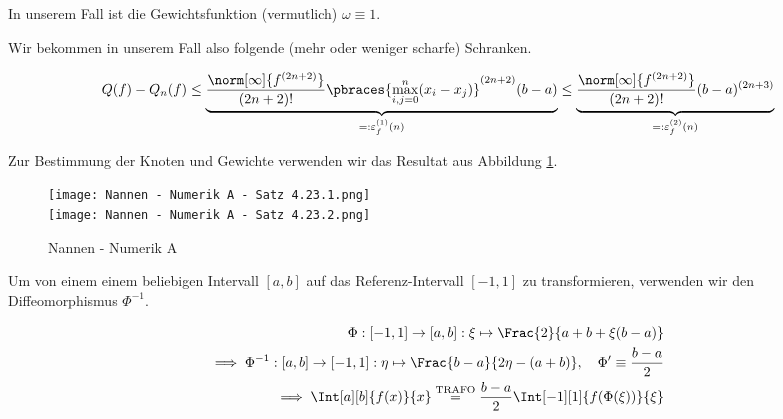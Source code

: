 \begin{solution}

In unserem Fall ist die Gewichtsfunktion (vermutlich) $\omega \equiv 1$.


Wir bekommen in unserem Fall also folgende (mehr oder weniger scharfe) Schranken.

\begin{align*}
  Q(f) - Q_n(f)
  \leq
  \underbrace
  {
    \frac
    {
      \norm[\infty]{f^{(2n+2)}}
    }{
      (2n + 2)!
    }
    \pbraces
    {
      \max_{i,j=0}^n
      (x_i - x_j)
    }^{(2n+2)}
    (b - a)
    }_{
    =: \varepsilon^{(1)}_f(n)
  }
  \leq
  \underbrace
  {
    \frac
    {
      \norm[\infty]{f^{(2n+2)}}
    }{
      (2n + 2)!
    }
    (b - a)^{(2n+3)}
  }_{
    =: \varepsilon^{(2)}_f(n)
  }
\end{align*}

Zur Bestimmung der Knoten und Gewichte verwenden wir das Resultat aus Abbildung \ref{fig:NNAS4.23}.

\begin{figure}[h!]
  \begin{boxedin}
    \begin{center}
      \texttt{[image: Nannen - Numerik A - Satz 4.23.1.png]} \\
      \vspace{0.5 cm}
      \texttt{[image: Nannen - Numerik A - Satz 4.23.2.png]}
      \caption{Nannen - Numerik A}
      \label{fig:NNAS4.23}
    \end{center}
  \end{boxedin}
\end{figure}

Um von einem einem beliebigen Intervall $[a, b]$ auf das Referenz-Intervall $[-1, 1]$ zu transformieren, verwenden wir den Diffeomorphismus $\Phi^{-1}$.

\begin{align*}
  \Phi:
  [-1, 1] \to [a, b]:
  \xi \mapsto \Frac{2}{a + b + \xi (b - a)} \\
  \implies
  \Phi^{-1}:
  [a, b] \to [-1, 1]:
  \eta \mapsto \Frac{b-a}{2 \eta - (a + b)},
  \quad
  \Phi^\prime \equiv \frac{b - a}{2} \\
  \implies
  \Int[a][b]{f(x)}{x}
  \stackrel{\text{TRAFO}}{=}
  \frac{b - a}{2}
  \Int[-1][1]{f(\Phi(\xi))}{\xi}
\end{align*}

\end{solution}


